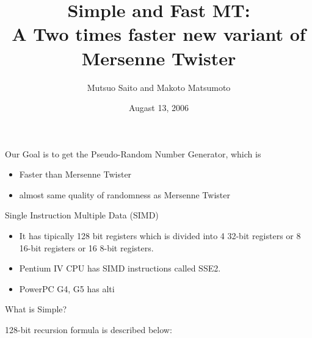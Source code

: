 \documentclass[landscape]{slides}
\begin{document}
\begin{slide}
  \title{Simple and Fast MT:\\
    A Two times faster new variant of Mersenne Twister}

  \author{Mutsuo Saito and Makoto Matsumoto}
  \date{Augast 13, 2006}
  \maketitle
\end{slide}
\begin{slide}
  Our Goal is to get the Pseudo-Random Number Generator, which is
  \begin{itemize}
    \item Faster than Mersenne Twister
    \item almost same quality of randomness as Mersenne Twister
  \end{itemize}
\end{slide}
\begin{slide}
  Single Instruction Multiple Data (SIMD)
  \begin{itemize}
  \item It has tipically 128 bit registers which is divided into 4
    32-bit registers or 8 16-bit registers or 16 8-bit registers.
  \item Pentium IV CPU has SIMD instructions called SSE2.
  \item PowerPC G4, G5 has alti
  \end{itemize}
\end{slide}
\begin{slide}
  What is Simple?

  128-bit recursion formula is described below:
\end{slide}
\end{document}
